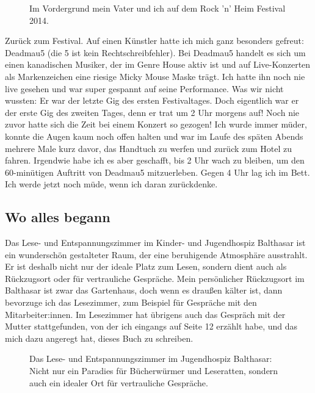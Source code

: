 \documentclass[fontsize=14pt,a4paper,headinclude,DIV=calc,automark]{scrbook}
\begin{document}
\setlength{\fboxsep}{0pt}    %
\setlength{\fboxrule}{0.2pt} %
\begin{figure}[ht]
    \raggedright
    \caption{Im Vordergrund mein Vater und ich auf dem Rock 'n' Heim Festival 2014.}
    \label{fig:hockenheim}
\end{figure}

Zurück zum Festival. Auf einen Künstler hatte ich mich ganz besonders gefreut: Deadmau5 (die 5 ist kein Rechtschreibfehler). Bei Deadmau5 handelt es sich um einen kanadischen Musiker, der im Genre House aktiv ist und auf Live-Konzerten als Markenzeichen eine riesige Micky Mouse Maske trägt. Ich hatte ihn noch nie live gesehen und war super gespannt auf seine Performance. Was wir nicht wussten: Er war der letzte Gig des ersten Festivaltages. Doch eigentlich war er der erste Gig des zweiten Tages, denn er trat um 2 Uhr morgens auf! Noch nie zuvor hatte sich die Zeit bei einem Konzert so gezogen! Ich wurde immer müder, konnte die Augen kaum noch offen halten und war im Laufe des späten Abends mehrere Male kurz davor, das Handtuch zu werfen und zurück zum Hotel zu fahren. Irgendwie habe ich es aber geschafft, bis 2 Uhr wach zu bleiben, um den 60-minütigen Auftritt von Deadmau5 mitzuerleben. Gegen 4 Uhr lag ich im Bett. Ich werde jetzt noch müde, wenn ich daran zurückdenke.

\subsection{Wo alles begann}

Das Lese- und Entspannungszimmer im Kinder- und Jugendhospiz Balthasar ist ein wunderschön gestalteter Raum, der eine beruhigende Atmosphäre ausstrahlt. Er ist deshalb nicht nur der ideale Platz zum Lesen, sondern dient auch als Rückzugsort oder für vertrauliche Gespräche. Mein persönlicher Rückzugsort im Balthasar ist zwar das Gartenhaus, doch wenn es draußen kälter ist, dann bevorzuge ich das Lesezimmer, zum Beispiel für Gespräche mit den Mitarbeiter:innen. Im Lesezimmer hat übrigens auch das Gespräch mit der Mutter stattgefunden, von der ich eingangs auf Seite 12 erzählt habe, und das mich dazu angeregt hat, dieses Buch zu schreiben.

\setlength{\fboxsep}{0pt}    %
\setlength{\fboxrule}{0.2pt} %
\begin{figure}[ht]
    \raggedright
    \caption{Das Lese- und Entspannungszimmer im Jugendhospiz Balthasar: Nicht nur ein Paradies für Bücherwürmer und Leseratten, sondern auch ein idealer Ort für vertrauliche Gespräche.}
    \label{fig:lesezimmer}
\end{figure}
\end{document}
